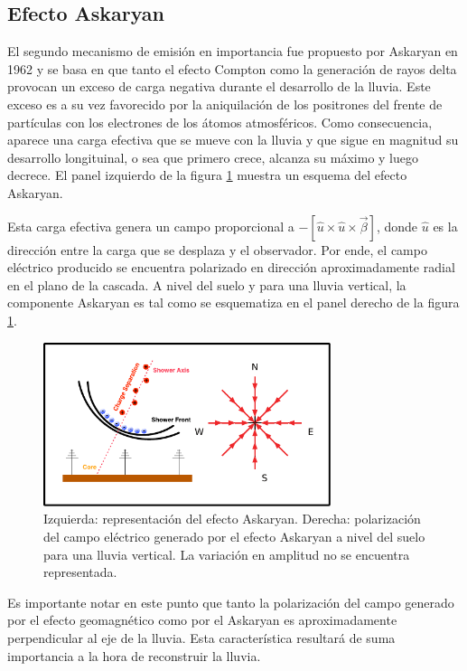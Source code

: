 \subsection{Efecto Askaryan}
\label{sbsc:ask_emision}
	
	El segundo mecanismo de emisión en importancia fue propuesto por Askaryan en 1962 \cite{askaryan1962} y se basa en que tanto el efecto Compton como la generaci\'on de rayos delta provocan un exceso de carga negativa durante el desarrollo de la lluvia.
	Este exceso es a su vez favorecido por la aniquilaci\'on de los positrones del frente de part\'iculas con los electrones de los \'atomos atmosf\'ericos. 
	Como consecuencia, aparece una carga efectiva que se mueve con la lluvia y que sigue en magnitud su desarrollo longituinal, o sea que primero crece, alcanza su m\'aximo y luego decrece.
	El panel izquierdo de la figura \ref{fig:ask_sketch} muestra un esquema del efecto Askaryan.
	
	Esta carga efectiva genera un campo proporcional a $-\left[\hat u \times \hat u \times \vec\beta\right]$\cite{cite:zhsPhysRevD}, donde $\hat u$ es la direcci\'on entre la carga que se desplaza y el observador\cite{jackson:1998}.
	Por ende, el campo eléctrico producido se encuentra polarizado en dirección aproximadamente radial en el plano de la cascada.
	A nivel del suelo y para una lluvia vertical, la componente Askaryan es tal como se esquematiza en el panel derecho de la figura \ref{fig:ask_sketch}.
	\begin{figure}[ht!]
		\centering
		\includegraphics[width=0.75\textwidth]{fig/EASRadio/ask_sketch}
		\caption{\label{fig:ask_sketch} Izquierda: representaci\'on del efecto Askaryan.
		Derecha: polarización del campo eléctrico generado por el efecto Askaryan a nivel del suelo para una lluvia vertical. La variaci\'on en amplitud no se encuentra representada.}
	\end{figure}
	
	Es importante notar en este punto que tanto la polarizaci\'on del campo generado por el efecto geomagn\'etico como por el Askaryan es aproximadamente perpendicular al eje de la lluvia.
	Esta caracter\'istica resultar\'a de suma importancia a la hora de reconstruir la lluvia.
	
